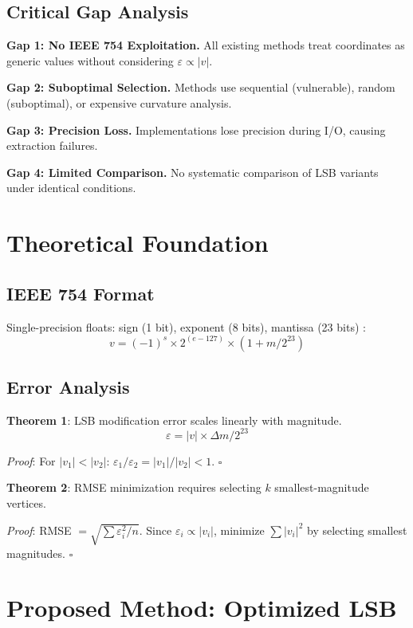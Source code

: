 \documentclass[conference]{IEEEtran}
\begin{document}
\subsection{Critical Gap Analysis}

\textbf{Gap 1: No IEEE 754 Exploitation.} All existing methods treat coordinates as generic values without considering $\varepsilon \propto |v|$.

\textbf{Gap 2: Suboptimal Selection.} Methods use sequential (vulnerable), random (suboptimal), or expensive curvature analysis.

\textbf{Gap 3: Precision Loss.} Implementations lose precision during I/O, causing extraction failures.

\textbf{Gap 4: Limited Comparison.} No systematic comparison of LSB variants under identical conditions.

\section{Theoretical Foundation}

\subsection{IEEE 754 Format}
Single-precision floats: sign (1 bit), exponent (8 bits), mantissa (23 bits) \cite{ieee754}:
\begin{equation}
v = (-1)^s \times 2^{(e-127)} \times (1 + m/2^{23})
\end{equation}

\subsection{Error Analysis}
\textbf{Theorem 1}: LSB modification error scales linearly with magnitude.
\begin{equation}
\varepsilon = |v| \times \Delta m / 2^{23}
\end{equation}

\textit{Proof}: For $|v_1| < |v_2|$: $\varepsilon_1/\varepsilon_2 = |v_1|/|v_2| < 1$. $\square$

\textbf{Theorem 2}: RMSE minimization requires selecting $k$ smallest-magnitude vertices.

\textit{Proof}: RMSE $= \sqrt{\sum \varepsilon_i^2 / n}$. Since $\varepsilon_i \propto |v_i|$, minimize $\sum |v_i|^2$ by selecting smallest magnitudes. $\square$

\section{Proposed Method: Optimized LSB}
\end{document}
